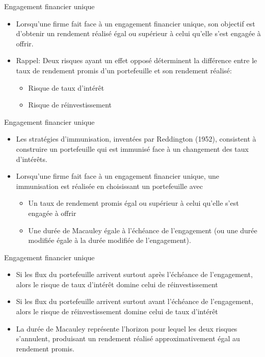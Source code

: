 \documentclass{beamer}
\begin{document}
\begin{frame}{Engagement financier unique}
\begin{itemize}[label=\bullet]
\item Lorsqu’une firme fait face à un engagement financier unique, son objectif est d’obtenir un rendement réalisé égal ou supérieur à celui qu’elle s’est engagée à offrir. 
\item Rappel: Deux risques ayant un effet opposé  déterminent la différence entre le taux de rendement promis d’un portefeuille et son rendement réalisé: 
\begin{itemize}[label=\bullet]
\item Risque de taux d’intérêt
\item Risque de réinvestissement
\end{itemize}
\end{itemize}
\end{frame}

\begin{frame}{Engagement financier unique}
\begin{itemize}[label=\bullet]
\item Les stratégies d’immunisation, inventées par Reddington (1952), consistent à construire un portefeuille qui est immunisé face à un changement des taux d’intérêts.   
\item Lorsqu’une firme fait face à un engagement financier unique, une immunisation est réalisée en choisissant un portefeuille avec 
\begin{itemize}[label=\bullet]
\item Un taux de rendement promis égal ou supérieur à celui qu’elle s’est engagée à offrir
\item Une durée de Macauley égale à l’échéance de l’engagement (ou une durée modifiée égale à la durée modifiée de l’engagement).
\end{itemize}
\end{itemize}
\end{frame}

\begin{frame}{Engagement financier unique}
\begin{itemize}[label=\bullet]
\item Si les flux du portefeuille arrivent surtout après l’échéance de l’engagement, alors le risque de taux d’intérêt domine celui de réinvestissement
\item Si les flux du portefeuille arrivent surtout avant l’échéance de l’engagement, alors le risque de réinvestissement domine celui de taux d’intérêt
\item La durée de Macauley représente l’horizon pour lequel les deux risques s’annulent, produisant un rendement réalisé approximativement égal au rendement promis.
\end{itemize}
\end{frame}
\end{document}
